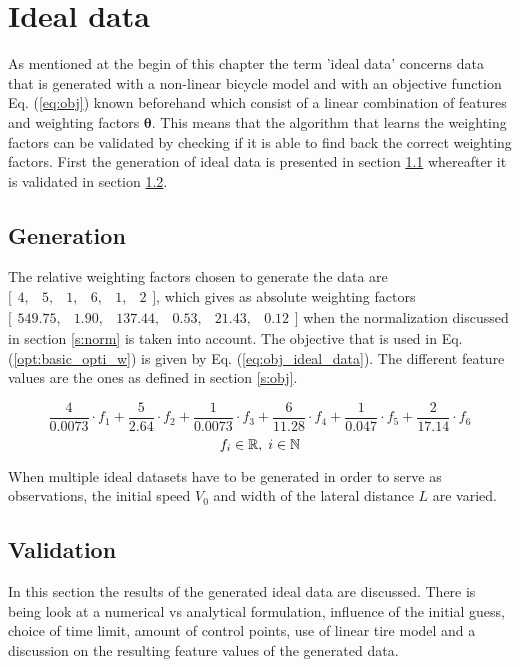 \section{Ideal data} \label{s:GD}
As mentioned at the begin of this chapter the term 'ideal data' concerns data that is generated with a non-linear bicycle model and with an objective function Eq. (\ref{eq:obj}) known beforehand which consist of a linear combination of features and weighting factors $\bm{\theta}$. This means that the algorithm that learns the weighting factors can be validated by checking if it is able to find back the correct weighting factors. First the generation of ideal data is presented in section \ref{s:generation} whereafter it is validated in section \ref{s:GD_val}.

\subsection{Generation}
\label{s:generation}
The relative weighting factors chosen to generate the data are $ \bigl[ \begin{smallmatrix} 4,&5,&1,&6,&1,&2\end{smallmatrix}\bigr]$, which gives as absolute weighting factors  $ \bigl[ \begin{smallmatrix} 549.75, &1.90, &137.44  ,&0.53,  &21.43, &0.12\end{smallmatrix}\bigr]$ when the normalization discussed in section \ref{s:norm} is taken into account. The objective that is used in Eq. (\ref{opt:basic_opti_w}) is given by Eq. (\ref{eq:obj_ideal_data}). The different feature values are the ones as defined in section \ref{s:obj}.

\begin{equation}\label{eq:obj_ideal_data}
\frac{4}{0.0073} \cdot f_1 +\frac{5}{2.64} \cdot f_2 +\frac{1}{0.0073} \cdot f_3 +\frac{6}{11.28} \cdot f_4 +\frac{1}{0.047} \cdot f_5 +\frac{2}{17.14} \cdot f_6 
\end{equation}
\[	f_i \in \mathbb{R}, \hspace{1mm}
i \in \mathbb{N}\]

 When multiple ideal datasets have to be generated in order to serve as observations, the initial speed $V_{0}$ and width of the lateral distance $L$ are varied.

\subsection{Validation} \label{s:GD_val}
In this section the results of the generated ideal data are discussed. There is being look at a numerical vs analytical formulation, influence of the initial guess, choice of time limit, amount of control points, use of linear tire model and a discussion on the resulting feature values of the generated data.

